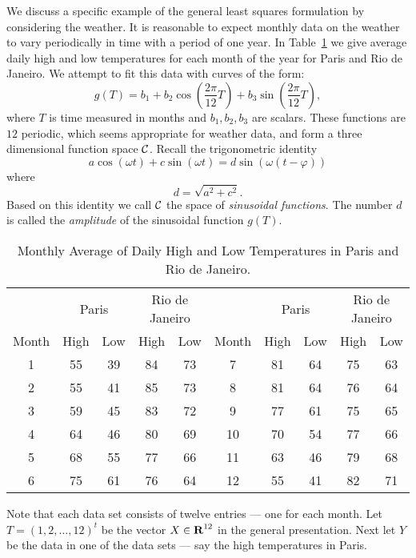 We discuss a specific example of the general least squares formulation by
considering the weather.  It is reasonable to expect monthly data on the
weather to vary periodically in time with a period of one year.  In
Table~\ref{T:parrio} we give average daily high and low temperatures for
each month of the year for Paris and Rio de Janeiro.  We attempt to fit this
data with curves of the form:
\[
g(T) = b_1 + b_2\cos\left(\frac{2\pi}{12}T\right) +
b_3\sin\left(\frac{2\pi}{12}T\right),
\]
where $T$ is time measured in months and $b_1,b_2,b_3$ are scalars.  These
functions are $12$ periodic, which seems appropriate for weather data, and
form a three dimensional function space ${\cal C}$.  Recall the trigonometric
identity
\[
a\cos(\omega t) + c\sin(\omega t) = d\sin(\omega(t-\varphi))
\]
where
\[
d = \sqrt{a^2+c^2}.
\]
Based on this identity we call ${\cal C}$ the space of {\em sinusoidal
functions\/}.  The number $d$ is called
the {\em amplitude\/} of the
sinusoidal function $g(T)$.



\begin{table}[htb]
\begin{center}
\begin{tabular}{|c||c|c||c|c|||c||c|c||c|c|}
\hline
  & \multicolumn{2}{c||}{Paris} & \multicolumn{2}{c|||}{Rio de Janeiro} &
  & \multicolumn{2}{c||}{Paris} & \multicolumn{2}{c|}{Rio de Janeiro}\\
Month & High & Low & High & Low & Month & High & Low & High & Low\\
\hline
  1 & 55 & 39 & 84 & 73 &   7 & 81 & 64 & 75 & 63 \\
  2 & 55 & 41 & 85 & 73 &   8 & 81 & 64 & 76 & 64 \\
  3 & 59 & 45 & 83 & 72 &   9 & 77 & 61 & 75 & 65 \\
  4 & 64 & 46 & 80 & 69 &  10 & 70 & 54 & 77 & 66 \\
  5 & 68 & 55 & 77 & 66 &  11 & 63 & 46 & 79 & 68 \\
  6 & 75 & 61 & 76 & 64 &  12 & 55 & 41 & 82 & 71 \\
\hline
\end{tabular}
\caption{Monthly Average of Daily High and Low Temperatures in Paris and Rio de
Janeiro.}
\label{T:parrio}
\end{center}
\end{table}

Note that each data set consists of twelve entries --- one for each month.
Let $T=(1,2,\ldots,12)^t$ be the vector $X\in\mbox{$\bf{R}$}^{12}$ in the general
presentation.  Next let $Y$ be the data in one of the data sets --- say the
high temperatures in Paris.

